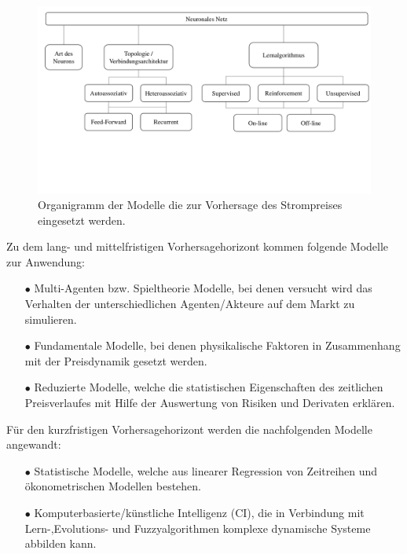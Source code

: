 \begin{figure}[!htb]
    \centering
        \includegraphics[page=2,width=1\textwidth]{Bilder/misc/ANN_Organigramme.pdf}
    \caption{Organigramm der Modelle die zur Vorhersage des Strompreises eingesetzt werden.\protect\footnotemark{}}
    \label{fig:ann_vorhers._modelle}
\end{figure}
\addtocounter{footnote}{-1}     %
\addtocounter{Hfootnote}{-1}    %
\wrapfigfoot{}



Zu dem lang- und mittelfristigen Vorhersagehorizont kommen folgende Modelle zur Anwendung:
\begin{itemize}
\item[\textbf{$\bullet$}]%
Multi-Agenten bzw. Spieltheorie Modelle, bei denen versucht wird das Verhalten der unterschiedlichen Agenten/Akteure auf dem Markt zu simulieren.

\item[\textbf{$\bullet$}]%
Fundamentale Modelle, bei denen physikalische Faktoren in Zusammenhang mit der Preisdynamik gesetzt werden.

\item[\textbf{$\bullet$}]%
Reduzierte Modelle, welche die statistischen Eigenschaften des zeitlichen Preisverlaufes mit Hilfe der Auswertung von Risiken und Derivaten erklären.
\end{itemize}

Für den kurzfristigen Vorhersagehorizont werden die nachfolgenden Modelle angewandt:
\begin{itemize}
\item[\textbf{$\bullet$}]%
Statistische Modelle, welche aus linearer Regression von Zeitreihen und ökonometrischen Modellen bestehen.

\item[\textbf{$\bullet$}]%
Komputerbasierte/künstliche Intelligenz (CI), die in Verbindung mit Lern-,Evolutions- und Fuzzyalgorithmen komplexe dynamische Systeme abbilden kann.
\end{itemize}

